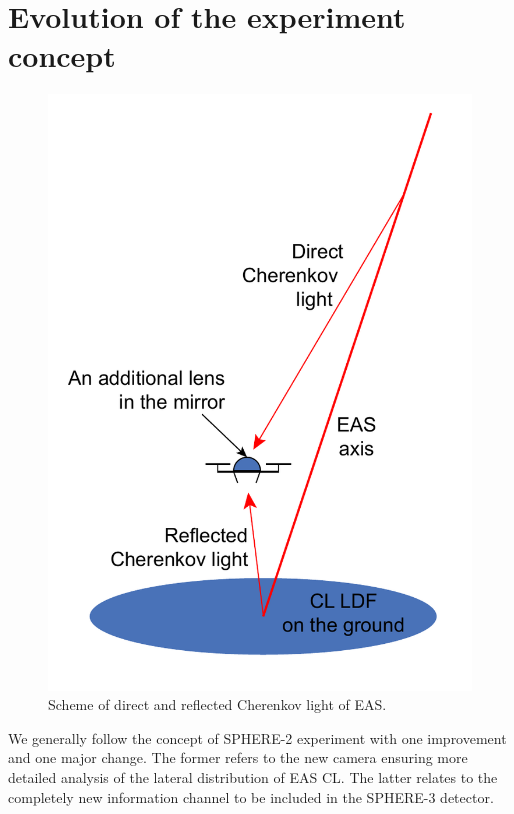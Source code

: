 \documentclass[a4paper,11pt]{article}
\begin{document}
\section{Evolution of the experiment concept}

\begin{figure}[t]
\centering %
\includegraphics[height=.35\textheight]{DirectCL.pdf}
\caption{Scheme of direct and reflected Cherenkov light of EAS.}
\label{fig:DirectCL}
\end{figure}

We generally follow the concept of SPHERE-2 experiment with one improvement and one major change. The former refers to the new camera ensuring more detailed analysis of the lateral distribution of EAS CL. The latter relates to the completely new information channel to be included in the SPHERE-3 detector.
\end{document}

